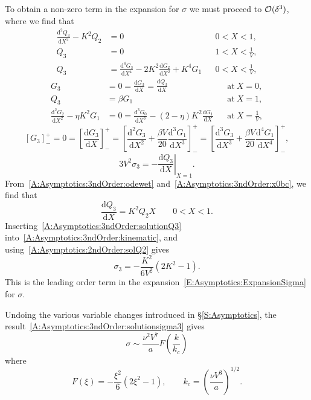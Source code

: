 \documentclass{jfm}
\newcommand{\dd}[2]{\frac{\mathrm{d} #1}{\mathrm{d} #2}}
\newcommand{\poisson}{\eta} %
\begin{document}
To obtain a non-zero term in the expansion for $\sigma$ we must proceed to $\mathcal{O}(\delta^3)$, where we find that
\begin{align}
 \dd{^2 Q_3}{X^2} - K^2 Q_2 &= 0 & &0 < X<1,\label{A:Asymptotics:3ndOrder:odewet}\\
Q_3 &= 0 & &1 < X< \frac{1}{V},\\
Q_3 &= \dd{^4 G_3}{X^4} - 2K^2\dd{G_2}{X^2}+ K^4 G_1 & & 0 < X < \frac{1}{V},
\end{align}
\begin{align}
G_3 &= 0 = \dd{G_3}{X}= \dd{Q_3}{X} & &\text{at}~X = 0,\label{A:Asymptotics:3ndOrder:x0bc}\\
Q_3 &=\beta G_1 & &\text{at}~X = 1,\label{A:Asymptotics:3ndOrder:PressureBC}\\
\dd{^2 G_2}{X^2} - \poisson K^2 G_1 &=0 = \dd{^3 G_0}{X^3}  - (2- \poisson)K^2 \dd{G_1}{X}& &\text{at}~X = \frac{1}{V},
\end{align}
\begin{equation}
\left[G_3\right]_-^+ =0 = \left[\dd{G_3}{X}\right]_-^+ = \left[\dd{^2 G_3}{X^2} + \frac{\beta V}{20}\dd{^3G_1}{X^3}\right]_-^+ = \left[\dd{^3 G_3}{X^3} + \frac{\beta V}{20}\dd{^4 G_1}{X^4}\right]_-^+,
\end{equation}
\begin{equation}\label{A:Asymptotics:3ndOrder:kinematic}
3V^2 \sigma_3 = -\left.\dd{Q_3}{X}\right|_{X=1}.
\end{equation}
From~\eqref{A:Asymptotics:3ndOrder:odewet} and~\eqref{A:Asymptotics:3ndOrder:x0bc}, we find that
\begin{equation}\label{A:Asymptotics:3ndOrder:solutionQ3}
\dd{Q_3}{X} = K^2 Q_2 X \qquad 0 < X < 1.
\end{equation}
Inserting~\eqref{A:Asymptotics:3ndOrder:solutionQ3} into~\eqref{A:Asymptotics:3ndOrder:kinematic}, and using~\eqref{A:Asymptotics:2ndOrder:solQ2} gives
\begin{equation}\label{A:Asymptotics:3ndOrder:solutionsigma3}
\sigma_3  = -\frac{K^2}{6V^2}\left(2K^2 - 1\right).
\end{equation}
This is the leading order term in the expansion~\eqref{E:Asymptotics:ExpansionSigma} for $\sigma$.

Undoing the various variable changes introduced in \S\ref{S:Asymptotics}, the result~\eqref{A:Asymptotics:3ndOrder:solutionsigma3} gives
\begin{equation}\label{A:Asymptotics:ThirdOrder:SigmaSolution}
\sigma\sim \frac{\nu^2 V^7}{a}F\left(\frac{k}{k_c}\right)
\end{equation}
where
\begin{equation}\label{A:Asymptotics:SigmaSolutionParticulars}
F(\xi) = -\frac{\xi^2}{6}\left(2\xi^2 -1\right), \qquad k_c = \left(\frac{\nu V^3}{a}\right)^{1/2}.
\end{equation}




\end{document}
